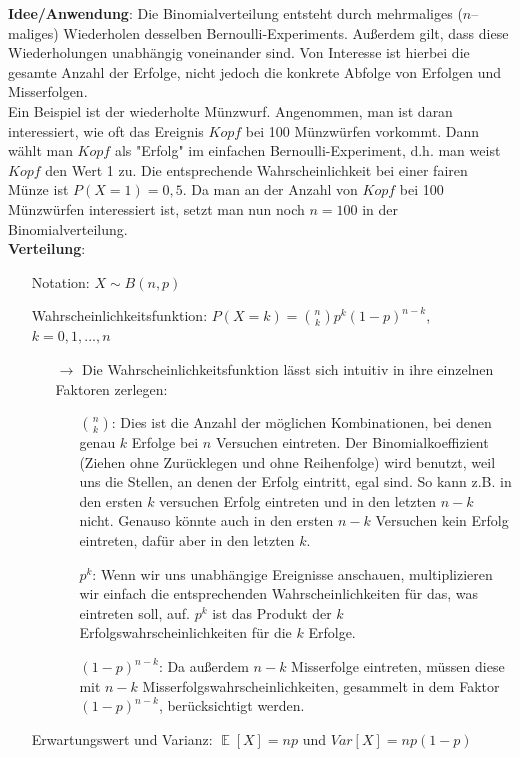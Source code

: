 \documentclass[a4paper]{article}
\DeclareMathOperator*{\E}{\mathbb{E}}
\begin{document}
\noindent \textbf{Idee/Anwendung}: Die Binomialverteilung entsteht durch mehrmaliges ($n$--maliges) Wiederholen desselben Bernoulli-Experiments. Außerdem gilt, dass diese Wiederholungen unabhängig voneinander sind. Von Interesse ist hierbei die gesamte Anzahl der Erfolge, nicht jedoch die konkrete Abfolge von Erfolgen und Misserfolgen. \\

\noindent Ein Beispiel ist der wiederholte Münzwurf. Angenommen, man ist daran interessiert, wie oft das Ereignis $Kopf$ bei 100 Münzwürfen vorkommt. Dann wählt man $Kopf$ als "Erfolg" im einfachen Bernoulli-Experiment, d.h. man weist $Kopf$ den Wert 1 zu. Die entsprechende Wahrscheinlichkeit bei einer fairen Münze ist $P(X=1)=0,5$. Da man an der Anzahl von $Kopf$ bei 100 Münzwürfen interessiert ist, setzt man nun noch $n=100$ in der Binomialverteilung. \\

\noindent \textbf{Verteilung}:
\begin{itemize}
\item[] Notation: $X\sim B(n,p)$
\item[] Wahrscheinlichkeitsfunktion: $P(X=k)=\binom{n}{k}p^k(1-p)^{n-k}$, $k=0,1,...,n$
	\begin{itemize}
	\item[$\rightarrow$] Die Wahrscheinlichkeitsfunktion lässt sich intuitiv in ihre einzelnen Faktoren zerlegen:
		\begin{itemize}
		\item[] $\binom{n}{k}$: Dies ist die Anzahl der möglichen Kombinationen, bei denen genau $k$ Erfolge bei $n$ Versuchen eintreten. Der Binomialkoeffizient (Ziehen ohne Zurücklegen und ohne Reihenfolge) wird benutzt, weil uns die Stellen, an denen der Erfolg eintritt, egal sind. So kann z.B. in den ersten $k$ versuchen Erfolg eintreten und in den letzten $n-k$ nicht. Genauso könnte auch in den ersten $n-k$ Versuchen kein Erfolg eintreten, dafür aber in den letzten $k$.
		\item[] $p^k$: Wenn wir uns unabhängige Ereignisse anschauen, multiplizieren wir einfach die entsprechenden Wahrscheinlichkeiten für das, was eintreten soll, auf. $p^k$ ist das Produkt der $k$ Erfolgswahrscheinlichkeiten für die $k$ Erfolge.
		\item[] $(1-p)^{n-k}$: Da außerdem $n-k$ Misserfolge eintreten, müssen diese mit $n-k$ Misserfolgswahrscheinlichkeiten, gesammelt in dem Faktor $(1-p)^{n-k}$, berücksichtigt werden.
		\end{itemize}
	\end{itemize}
\item[] Erwartungswert und Varianz: $\E[X]=np$ und $Var[X]=np(1-p)$

\end{itemize}
\end{document}
